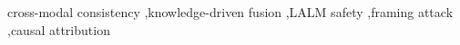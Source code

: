 \documentclass[preprint,12pt,authoryear]{elsarticle}
\begin{document}
\begin{frontmatter}
\begin{keyword}
cross-modal consistency \sep knowledge-driven fusion \sep LALM safety \sep framing attack \sep causal attribution
\end{keyword}

\end{frontmatter}

\linenumbers













\end{document}
